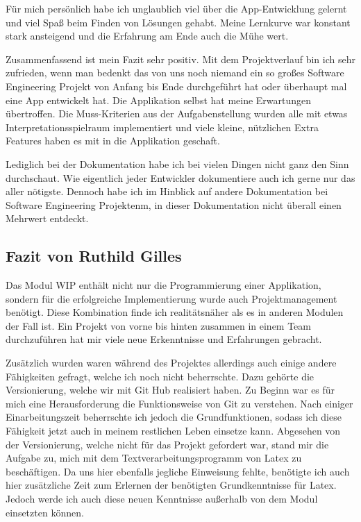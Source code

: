 Für mich persönlich habe ich unglaublich viel über die App-Entwicklung gelernt und viel Spaß beim Finden von Lösungen gehabt. Meine Lernkurve war konstant stark ansteigend und die Erfahrung am Ende auch die Mühe wert.

Zusammenfassend ist mein Fazit sehr positiv. Mit dem Projektverlauf bin ich sehr zufrieden, wenn man bedenkt das von uns noch niemand ein so großes Software Engineering Projekt von Anfang bis Ende durchgeführt hat oder überhaupt mal eine App entwickelt hat. Die Applikation selbst hat meine Erwartungen übertroffen. Die Muss-Kriterien aus der Aufgabenstellung wurden alle mit etwas Interpretationsspielraum implementiert und viele kleine, nützlichen Extra Features haben es mit in die Applikation geschaft.

Lediglich bei der Dokumentation habe ich bei vielen Dingen nicht ganz den Sinn durchschaut. Wie eigentlich jeder Entwickler dokumentiere auch ich gerne nur das aller nötigste. Dennoch habe ich im Hinblick auf andere Dokumentation bei Software Engineering Projektenm, in dieser Dokumentation nicht überall einen Mehrwert entdeckt.

\subsection{Fazit von Ruthild Gilles}

Das Modul WIP enthält nicht nur die Programmierung einer Applikation, sondern für die erfolgreiche Implementierung wurde auch Projektmanagement benötigt. Diese Kombination finde ich realitätsnäher als es in anderen Modulen der Fall ist. Ein Projekt von vorne bis hinten zusammen in einem Team durchzuführen hat mir viele neue Erkenntnisse und Erfahrungen gebracht.

Zusätzlich wurden waren während des Projektes allerdings auch einige andere Fähigkeiten gefragt, welche ich noch nicht beherrschte. Dazu gehörte die Versionierung, welche wir mit Git Hub realisiert haben. Zu Beginn war es für mich eine Herausforderung die Funktionsweise von Git zu verstehen. Nach einiger Einarbeitungszeit beherrschte ich jedoch die Grundfunktionen, sodass ich diese Fähigkeit jetzt auch in meinem restlichen Leben einsetze kann. Abgesehen von der Versionierung, welche nicht für das Projekt gefordert war, stand mir die Aufgabe zu, mich mit dem Textverarbeitungsprogramm von Latex zu beschäftigen. Da uns hier ebenfalls jegliche Einweisung fehlte, benötigte ich auch hier zusätzliche Zeit zum Erlernen der benötigten Grundkenntnisse für Latex. Jedoch werde ich auch diese neuen Kenntnisse außerhalb von dem Modul einsetzten können.

